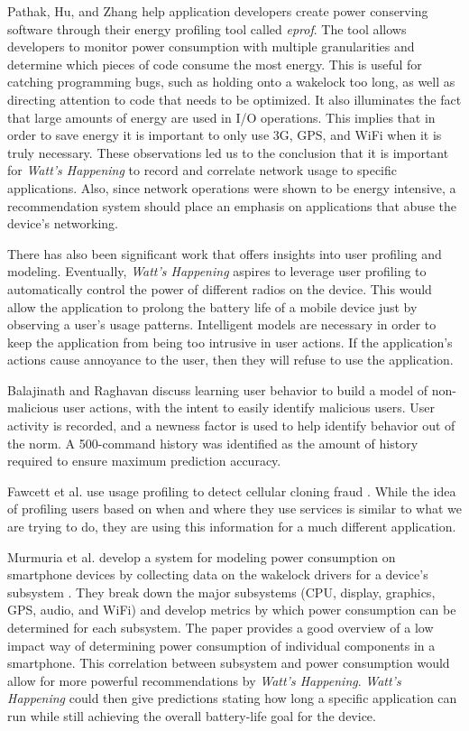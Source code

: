 Pathak, Hu, and Zhang help application developers create power conserving software through their energy profiling tool called \emph{eprof}\cite{Pathak:2012:ESI:2168836.2168841}. 
The tool allows developers to monitor power consumption with multiple granularities and determine which pieces of code consume the most energy. 
This is useful for catching programming bugs, such as holding onto a wakelock too long, as well as directing attention to code that needs to be optimized. 
It also illuminates the fact that large amounts of energy are used in I/O operations. 
This implies that in order to save energy it is important to only use 3G, GPS, and WiFi when it is truly necessary.
These observations led us to the conclusion that it is important for \emph{Watt's Happening} to record and correlate network usage to specific applications.
Also, since network operations were shown to be energy intensive, a recommendation system should place an emphasis on applications that abuse the device's networking.

There has also been significant work that offers insights into user profiling and modeling.
Eventually, \emph{Watt's Happening} aspires to leverage user profiling to automatically control the power of different radios on the device. 
This would allow the application to prolong the battery life of a mobile device just by observing a user's usage patterns.
Intelligent models are necessary in order to keep the application from being too intrusive in user actions.
If the application's actions cause annoyance to the user, then they will refuse to use the application. 

Balajinath and Raghavan discuss learning user behavior to build a model of non-malicious user actions, with the intent to easily identify malicious users\cite{Balajinath:2001:IDT:2294491.2294970}. 
User activity is recorded, and a newness factor is used to help identify behavior out of the norm. 
A 500-command history was identified as the amount of history required to ensure maximum prediction accuracy. 

Fawcett et al. use usage profiling to detect cellular cloning fraud \cite{dataMiningFraudDetection}. 
While the idea of profiling users based on when and where they use services is similar to what we are trying to do, they are using this information for a much different application. 

Murmuria et al. develop a system for modeling power consumption on smartphone devices by collecting data on the wakelock drivers for a device's subsystem \cite{mobilePowerUsageMeasurements}. 
They break down the major subsystems (CPU, display, graphics, GPS, audio, and WiFi) and develop metrics by which power consumption can be determined for each subsystem. 
The paper provides a good overview of a low impact way of determining power consumption of individual components in a smartphone.
This correlation between subsystem and power consumption would allow for more powerful recommendations by \emph{Watt's Happening}.
\emph{Watt's Happening} could then give predictions stating how long a specific application can run while still achieving the overall battery-life goal for the device.

